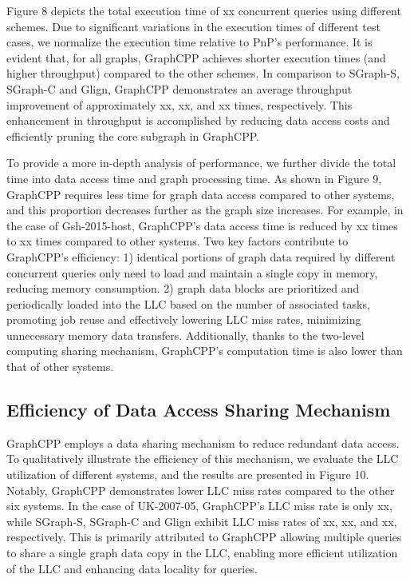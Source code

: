 \documentclass[lettersize,journal]{IEEEtran} %
\begin{document}
Figure 8 depicts the total execution time of xx concurrent queries using different schemes. Due to significant variations in the execution times of different test cases, we normalize the execution time relative to PnP's performance. It is evident that, for all graphs, GraphCPP achieves shorter execution times (and higher throughput) compared to the other schemes. In comparison to SGraph-S, SGraph-C and Glign, GraphCPP demonstrates an average throughput improvement of approximately xx, xx, and xx times, respectively. This enhancement in throughput is accomplished by reducing data access costs and efficiently pruning the core subgraph in GraphCPP.

To provide a more in-depth analysis of performance, we further divide the total time into data access time and graph processing time. As shown in Figure 9, GraphCPP requires less time for graph data access compared to other systems, and this proportion decreases further as the graph size increases. For example, in the case of Gsh-2015-host, GraphCPP's data access time is reduced by xx times to xx times compared to other systems. Two key factors contribute to GraphCPP's efficiency: 1) identical portions of graph data required by different concurrent queries only need to load and maintain a single copy in memory, reducing memory consumption. 2) graph data blocks are prioritized and periodically loaded into the LLC based on the number of associated tasks, promoting job reuse and effectively lowering LLC miss rates, minimizing unnecessary memory data transfers. Additionally, thanks to the two-level computing sharing mechanism, GraphCPP's computation time is also lower than that of other systems.

\subsection{Efficiency of Data Access Sharing Mechanism}
GraphCPP employs a data sharing mechanism to reduce redundant data access. To qualitatively illustrate the efficiency of this mechanism, we evaluate the LLC utilization of different systems, and the results are presented in Figure 10. Notably, GraphCPP demonstrates lower LLC miss rates compared to the other six systems. In the case of UK-2007-05, GraphCPP's LLC miss rate is only xx, while SGraph-S, SGraph-C and Glign exhibit LLC miss rates of xx, xx, and xx, respectively. This is primarily attributed to GraphCPP allowing multiple queries to share a single graph data copy in the LLC, enabling more efficient utilization of the LLC and enhancing data locality for queries.
\end{document}
